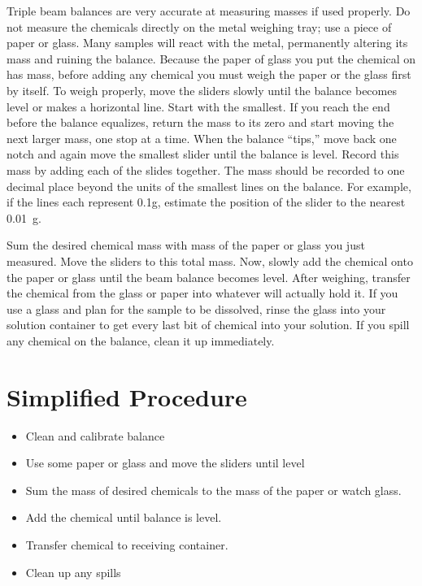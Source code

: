 Triple beam balances are very accurate at measuring masses if used properly. Do not measure the chemicals directly on the metal weighing tray; use a piece of paper or glass. Many samples will react with the metal, permanently altering its mass and ruining the balance. Because the paper of glass you put the chemical on has mass, before adding any chemical you must weigh the paper or the glass first by itself. To weigh properly, move the sliders slowly until the balance becomes level or makes a horizontal line. Start with the smallest. If you reach the end before the balance equalizes, return the mass to its zero and start moving the next larger mass, one stop at a time. When the balance “tips,” move back one notch and again move the smallest slider until the balance is level. Record this mass by adding each of the slides together. The mass should be recorded to one decimal place beyond the units of the smallest lines on the balance. For example, if the lines each represent 0.1g, estimate the position of the slider to the nearest 0.01~g.

Sum the desired chemical mass with mass of the paper or glass you just measured. Move the sliders to this total mass. Now, slowly add the chemical onto the paper or glass until the beam balance becomes level. After weighing, transfer the chemical from the glass or paper into whatever will actually hold it. If you use a glass and plan for the sample to be dissolved, rinse the glass into your solution container to get every last bit of chemical into your solution. If you spill any chemical on the balance, clean it up immediately.

\section{Simplified Procedure}

\begin{itemize}

\item{Clean and calibrate balance}
\item{Use some paper or glass and move the sliders until level}
\item{Sum the mass of desired chemicals to the mass of the paper or watch glass.}
\item{Add the chemical until balance is level.}
\item{Transfer chemical to receiving container.}
\item{Clean up any spills}

\end{itemize}

